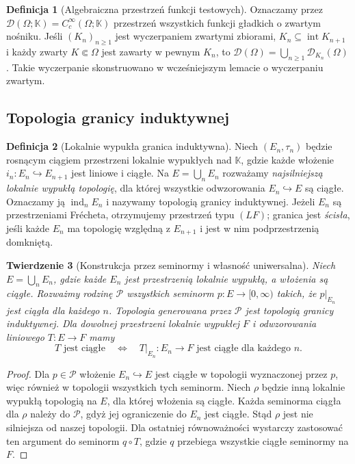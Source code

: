 \documentclass[11pt,a4paper]{article}
\numberwithin{equation}{section}
\theoremstyle{plain}
\newtheorem{twierdzenie}{Twierdzenie}[section]
\theoremstyle{definition}
\newtheorem{definicja}[twierdzenie]{Definicja}
\theoremstyle{remark}
\newcommand{\K}{\mathbb K}
\begin{document}
\begin{definicja}[Algebraiczna przestrzeń funkcji testowych]
\label{def:D-algebraic18}
Oznaczamy przez $\mathcal D(\Omega;\K)=C_c^\infty(\Omega;\K)$
przestrzeń wszystkich funkcji gładkich o zwartym nośniku.
Jeśli $(K_n)_{n\ge1}$ jest wyczerpaniem zwartymi zbiorami,
$K_n\subseteq\operatorname{int}K_{n+1}$ i każdy zwarty
$K\Subset\Omega$ jest zawarty w pewnym $K_n$, to
$\mathcal D(\Omega)=\bigcup_{n\ge1}\mathcal D_{K_n}(\Omega)$.
Takie wyczerpanie skonstruowano w
wcześniejszym lemacie o wyczerpaniu zwartym.
\end{definicja}

\subsection{Topologia granicy induktywnej}

\begin{definicja}[Lokalnie wypukła granica induktywna]
\label{def:LF18}
Niech $(E_n,\tau_n)$ będzie rosnącym ciągiem przestrzeni
lokalnie wypukłych nad $\K$, gdzie każde włożenie
$i_n:E_n\hookrightarrow E_{n+1}$ jest liniowe i ciągłe.
Na $E=\bigcup_nE_n$ rozważamy \emph{najsilniejszą lokalnie
wypukłą topologię}, dla której wszystkie odwzorowania
$E_n\hookrightarrow E$ są ciągłe. Oznaczamy ją
$\operatorname{ind}_n E_n$ i nazywamy topologią granicy induktywnej.
Jeżeli $E_n$ są przestrzeniami Fr\'echeta, otrzymujemy
przestrzeń typu $(LF)$; granica jest \emph{ścisła}, jeśli
każde $E_n$ ma topologię względną z $E_{n+1}$ i jest w nim
podprzestrzenią domkniętą.
\end{definicja}

\begin{twierdzenie}[Konstrukcja przez seminormy i własność uniwersalna]
\label{thm:LF-universal18}
Niech $E=\bigcup_nE_n$, gdzie każde $E_n$ jest przestrzenią
lokalnie wypukłą, a włożenia są ciągłe. Rozważmy rodzinę
$\mathcal P$ wszystkich seminorm $p:E\to[0,\infty)$ takich,
że $p|_{E_n}$ jest ciągła dla każdego $n$.
Topologia generowana przez $\mathcal P$ jest topologią
granicy induktywnej. Dla dowolnej przestrzeni lokalnie
wypukłej $F$ i odwzorowania liniowego $T:E\to F$ mamy
\[
 T\text{ jest ciągłe}\quad\Longleftrightarrow\quad
 T|_{E_n}:E_n\to F\text{ jest ciągłe dla każdego }n.
\]
\end{twierdzenie}
\begin{proof}
Dla $p\in\mathcal P$ włożenie $E_n\hookrightarrow E$ jest
ciągłe w topologii wyznaczonej przez $p$, więc również
w topologii wszystkich tych seminorm. Niech $\rho$ będzie
inną lokalnie wypukłą topologią na $E$, dla której włożenia
są ciągłe. Każda seminorma ciągła dla $\rho$ należy do
$\mathcal P$, gdyż jej ograniczenie do $E_n$ jest ciągłe.
Stąd $\rho$ jest nie silniejsza od naszej topologii.
Dla ostatniej równoważności wystarczy zastosować ten
argument do seminorm $q\circ T$, gdzie $q$ przebiega
wszystkie ciągłe seminormy na $F$.
\end{proof}
\end{document}
